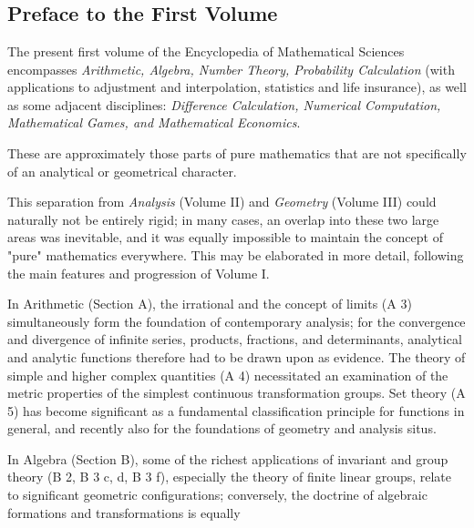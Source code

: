 \chapter*{}

\vspace{-0.5cm}
\section*{Preface to the First Volume}

The present first volume of the Encyclopedia of Mathematical Sciences encompasses \textit{Arithmetic, Algebra, Number Theory, Probability Calculation} (with applications to adjustment and interpolation, statistics and life insurance), as well as some adjacent disciplines: \textit{Difference Calculation, Numerical Computation, Mathematical Games, and Mathematical Economics}.

These are approximately those parts of pure mathematics that are not specifically of an analytical or geometrical character.

This separation from \textit{Analysis} (Volume II) and \textit{Geometry} (Volume III) could naturally not be entirely rigid; in many cases, an overlap into these two large areas was inevitable, and it was equally impossible to maintain the concept of "pure" mathematics everywhere. This may be elaborated in more detail, following the main features and progression of Volume I.

In Arithmetic (Section A), the irrational and the concept of limits (A 3) simultaneously form the foundation of contemporary analysis; for the convergence and divergence of infinite series, products, fractions, and determinants, analytical and analytic functions therefore had to be drawn upon as evidence. The theory of simple and higher complex quantities (A 4) necessitated an examination of the metric properties of the simplest continuous transformation groups. Set theory (A 5) has become significant as a fundamental classification principle for functions in general, and recently also for the foundations of geometry and analysis situs.

In Algebra (Section B), some of the richest applications of invariant and group theory (B 2, B 3 c, d, B 3 f), especially the theory of finite linear groups, relate to significant geometric configurations; conversely, the doctrine of algebraic formations and transformations is equally

